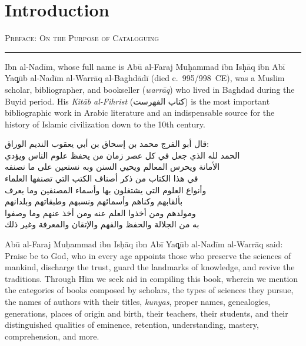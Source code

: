 \documentclass[11pt,a4paper]{article}
\newcommand{\ar}[1]{{\arabicfont\beginR #1\endR}}
\newcommand{\bilingual}[2]{%
  \noindent
  \begin{minipage}[t]{0.47\textwidth}
    \vspace{0pt}
    \begin{flushright}
    {\arabicfont\beginR #1\endR}
    \end{flushright}
  \end{minipage}%
  \hfill\vline\hfill
  \begin{minipage}[t]{0.47\textwidth}
    \vspace{0pt}
    #2
  \end{minipage}%
  \par\vspace{0.8em}
}
\newcommand{\bilingualsection}[2]{%
  \vspace{1em}%
  \noindent
  \begin{minipage}[t]{0.47\textwidth}
    \begin{flushright}
    \textsc{\color{sectioncolor}\ar{#1}}
    \end{flushright}
  \end{minipage}%
  \hfill
  \begin{minipage}[t]{0.47\textwidth}
    \textsc{\color{sectioncolor}#2}
  \end{minipage}%
  \par\vspace{0.5em}\hrule\vspace{0.8em}%
}
\begin{document}
\section*{Introduction}

\bilingualsection{مقدمة المؤلف في فائدة التصنيف}{Preface: On the Purpose of Cataloguing}

Ibn al-Nad\=im, whose full name is Ab\=u al-Faraj Mu\d{h}ammad
ibn Is\d{h}\=aq ibn Ab\=i Ya\c{q}\=ub al-Nad\=im al-Warr\=aq al-Baghd\=ad\=i
(died c.~995/998~CE), was a Muslim scholar, bibliographer, and bookseller
(\textit{warr\=aq}) who lived in Baghdad during the Buyid period. His
\textit{Kit\=ab al-Fihrist} (\ar{كتاب الفهرست}) is the most
important bibliographic work in Arabic literature and an indispensable
source for the history of Islamic civilization down to the 10th century.

\vspace{0.5em}
\bilingual
{قال أبو الفرج محمد بن إسحاق بن أبي يعقوب النديم الوراق:\\
الحمد لله الذي جعل في كل عصر زمان من يحفظ علوم الناس ويؤدي\\
الأمانة ويحرس المعالم ويحيي السنن وبه نستعين على ما نصنفه\\
في هذا الكتاب من ذكر أصناف الكتب التي تصنفها العلماء\\
وأنواع العلوم التي يشتغلون بها وأسماء المصنفين وما يعرف\\
بألقابهم وكناهم وأسمائهم ونسبهم وطبقاتهم وبلدانهم\\
ومولدهم ومن أخذوا العلم عنه ومن أخذ عنهم وما وصفوا\\
به من الجلالة والحفظ والفهم والإتقان والمعرفة وغير ذلك}
{Ab\=u al-Faraj Mu\d{h}ammad ibn Is\d{h}\=aq ibn Ab\=i Ya\c{q}\=ub al-Nad\=im
al-Warr\=aq said: Praise be to God, who in every age appoints those who
preserve the sciences of mankind, discharge the trust, guard the landmarks
of knowledge, and revive the traditions. Through Him we seek aid in
compiling this book, wherein we mention the categories of books composed
by scholars, the types of sciences they pursue, the names of authors with
their titles, \textit{kunyas}, proper names, genealogies, generations,
places of origin and birth, their teachers, their students, and their
distinguished qualities of eminence, retention, understanding, mastery,
comprehension, and more.}
\end{document}
